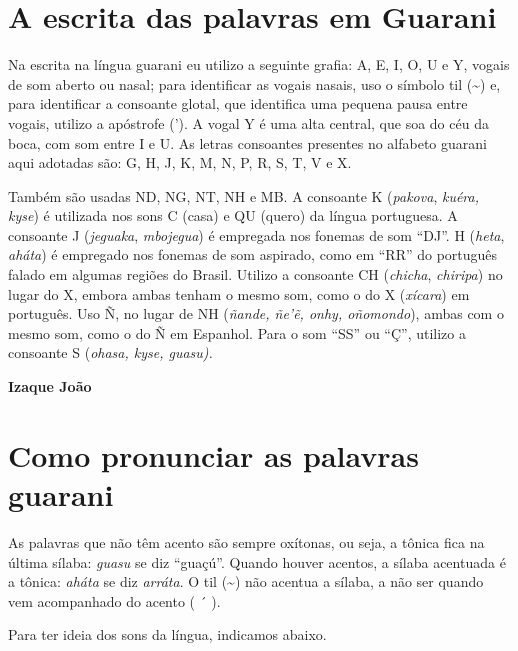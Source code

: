 \chapter{A escrita das palavras em Guarani}

Na escrita na língua guarani eu utilizo a seguinte grafia: A, E, I, O, U
e Y, vogais de som aberto ou nasal; para identificar as vogais nasais,
uso o símbolo til (\textasciitilde{}) e, para identificar a consoante
glotal, que identifica uma pequena pausa entre vogais, utilizo a
apóstrofe ('). A vogal Y é uma alta central, que soa do céu da boca, com
som entre I e U. As letras consoantes presentes no alfabeto guarani aqui
adotadas são: G, H, J, K, M, N, P, R, S, T, V e X.

Também são usadas ND, NG, NT, NH e MB. A consoante K (\emph{pakova},
\emph{kuéra, kyse}) é utilizada nos sons C (casa) e QU (quero) da língua
portuguesa. A consoante J (\emph{jeguaka}, \emph{mbojegua}) é empregada
nos fonemas de som ``DJ''. H (\emph{heta}, \emph{aháta}) é empregado nos
fonemas de som aspirado, como em ``RR'' do português falado em algumas
regiões do Brasil. Utilizo a consoante CH (\emph{chicha},
\emph{chiripa}) no lugar do X, embora ambas tenham o mesmo som, como o
do X (\emph{xícara}) em português. Uso Ñ, no lugar de NH (\emph{ñande,
ñe'ẽ, onhy, oñomondo}), ambas com o mesmo som, como o do Ñ em Espanhol.
Para o som ``SS'' ou ``Ç'', utilizo a consoante S (\emph{ohasa, kyse,
guasu).}

\textbf{Izaque João}

\chapter{Como pronunciar as palavras guarani}

As palavras que não têm acento são sempre oxítonas, ou seja, a tônica
fica na última sílaba: \emph{guasu} se diz ``guaçú''. Quando houver
acentos, a sílaba acentuada é a tônica: \emph{aháta} se diz
\emph{arráta}. O til (\textasciitilde{}) não acentua a sílaba, a não ser
quando vem acompanhado do acento ( ´ ).

Para ter ideia dos sons da língua, indicamos abaixo.

